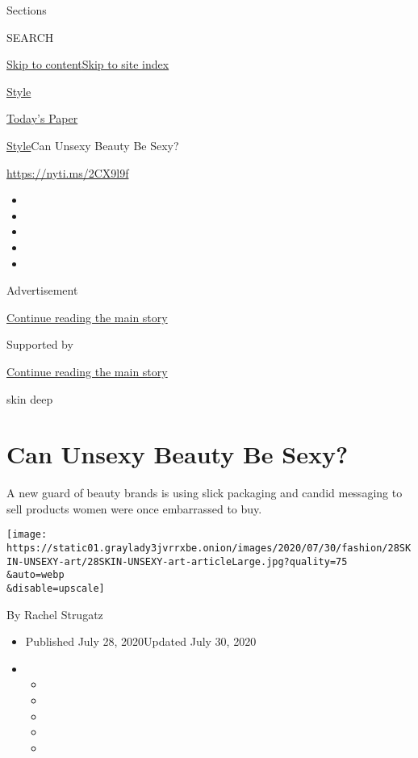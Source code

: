 Sections

SEARCH

\protect\hyperlink{site-content}{Skip to
content}\protect\hyperlink{site-index}{Skip to site index}

\href{https://www.nytimes3xbfgragh.onion/section/style}{Style}

\href{https://myaccount.nytimes3xbfgragh.onion/auth/login?response_type=cookie\&client_id=vi}{}

\href{https://www.nytimes3xbfgragh.onion/section/todayspaper}{Today's
Paper}

\href{/section/style}{Style}\textbar{}Can Unsexy Beauty Be Sexy?

\href{https://nyti.ms/2CX9l9f}{https://nyti.ms/2CX9l9f}

\begin{itemize}
\item
\item
\item
\item
\item
\end{itemize}

Advertisement

\protect\hyperlink{after-top}{Continue reading the main story}

Supported by

\protect\hyperlink{after-sponsor}{Continue reading the main story}

skin deep

\hypertarget{can-unsexy-beauty-be-sexy}{%
\section{Can Unsexy Beauty Be Sexy?}\label{can-unsexy-beauty-be-sexy}}

A new guard of beauty brands is using slick packaging and candid
messaging to sell products women were once embarrassed to buy.

\texttt{[image: https://static01.graylady3jvrrxbe.onion/images/2020/07/30/fashion/28SKIN-UNSEXY-art/28SKIN-UNSEXY-art-articleLarge.jpg?quality=75\\\&auto=webp\\\&disable=upscale]}

By Rachel Strugatz

\begin{itemize}
\item
  Published July 28, 2020Updated July 30, 2020
\item
  \begin{itemize}
  \item
  \item
  \item
  \item
  \item
  \end{itemize}
\end{itemize}

